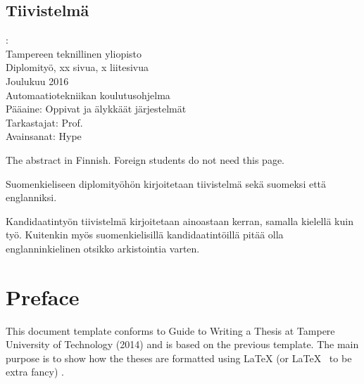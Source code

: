 \documentclass[12pt,a4paper,english
]{tutthesis}
\begin{document}
\begin{otherlanguage}{finnish} %
\chapter*{Tiivistelmä} %

\begin{spacing}{1.0}
         {\bf \textsf{\MakeUppercase{\@author}}}: \@titleB\\  %
         \textsf{Tampereen teknillinen yliopisto}\\
         \textsf{Diplomityö, xx sivua, x liitesivua}\\ %
         \textsf{Joulukuu 2016}\\
         \textsf{Automaatiotekniikan koulutusohjelma}\\
         \textsf{Pääaine: Oppivat ja älykkäät järjestelmät}\\
         \textsf{Tarkastajat:  Prof. \@examiner}\\ %
         \textsf{Avainsanat: Hype}\\
\end{spacing}

The abstract in Finnish. Foreign students do not need this page.

Suomenkieliseen diplomityöhön kirjoitetaan tiivistelmä sekä suomeksi
että englanniksi.

Kandidaatintyön tiivistelmä kirjoitetaan ainoastaan kerran, samalla
kielellä kuin työ. Kuitenkin myös suomenkielisillä kandidaatintöillä
pitää olla englanninkielinen otsikko arkistointia varten.

\end{otherlanguage} %


\chapter*{Preface}

This document template conforms to Guide to Writing a Thesis at
Tampere University of Technology (2014) and is based on the previous
template. The main purpose is to show how the theses are formatted
using LaTeX (or \LaTeX ~ to be extra fancy) .
\end{document}
